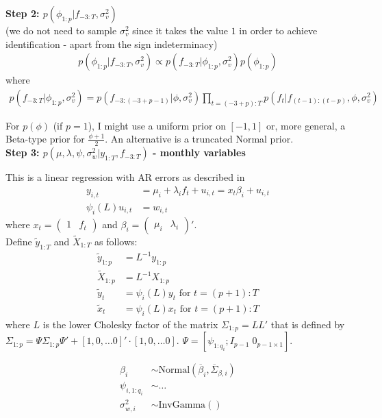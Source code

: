 \textbf{Step 2: $p(\phi_{1:p}|f_{-3:T}, \sigma_{v}^2)$}\\
(we do not need to sample $\sigma_v^2$ since it takes the value $1$ in order to achieve identification - apart from the sign indeterminacy)
\begin{align*}
p(\phi_{1:p}|f_{-3:T}, \sigma_v^2) \propto p(f_{-3:T}|\phi_{1:p}, \sigma_v^2) p(\phi_{1:p})
\end{align*}
where
\begin{align*}
p(f_{-3:T}|\phi_{1:p}, \sigma_{v}^2) = p(f_{-3:(-3+p-1)}|\phi, \sigma_{v}^2)\prod_{t=(-3+p):T} p(f_t|f_{(t-1):(t-p)}, \phi, \sigma_{v}^2)
\end{align*}

For $p(\phi)$ (if $p=1$), I might use a uniform prior on $[-1,1]$ or, more general, a Beta-type prior for $\frac{\phi+1}{2}$. An alternative is a truncated Normal prior.\\

\textbf{Step 3: $p(\mu, \lambda, \psi, \sigma_{w}^2|y_{1:T}, f_{-3:T})$ - monthly variables}

This is a linear regression with AR errors as described in \citet[section 4.1]{ChibGreenberg1994}
\begin{align}
y_{i,t} &= \mu_i + \lambda_i f_t + u_{i,t} = x_t\beta_i + u_{i,t} \\
\psi_i(L)u_{i,t} &= w_{i,t}
\end{align}
where $x_t = \begin{pmatrix} 1 & f_t \end{pmatrix}$ and $\beta_i = \begin{pmatrix} \mu_i & \lambda_i \end{pmatrix}'$.\\

Define $\tilde{y}_{1:T}$ and $\tilde{X}_{1:T}$ as follows:
\begin{align}
\tilde{y}_{1:p} &= L^{-1}y_{1:p}\\ 
\tilde{X}_{1:p} &= L^{-1}X_{1:p}\\
\tilde{y}_t     &= \psi_i(L) y_t \text{ for } t=(p+1):T\\
\tilde{x}_t     &= \psi_i(L) x_t \text{ for } t=(p+1):T
\end{align}
where $L$ is the lower Cholesky factor of the matrix $\Sigma_{1:p}=LL'$ that is defined by $\Sigma_{1:p} = \Psi \Sigma_{1:p} \Psi' + [1,0, \dots 0]'\cdot[1,0, \dots 0]$. $\Psi = [\psi_{1:q_i}; I_{p-1} \; 0_{p-1\times 1}]$.

\begin{align*}
\beta_i &\sim \mathrm{Normal}(\overline{\beta}_i, \overline{\Sigma}_{\beta,i}) \\
\psi_{i,1:q_i} &\sim \dots \\
\sigma_{w,i}^2 &\sim \mathrm{InvGamma}()
\end{align*}


